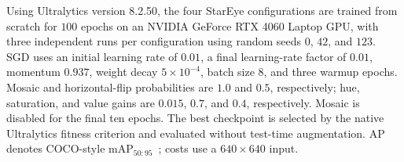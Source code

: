 \documentclass[letterpaper,10pt,conference]{ieeeconf}
\begin{document}
Using Ultralytics version 8.2.50, the four StarEye configurations are trained
from scratch for \(100\) epochs on an NVIDIA GeForce RTX 4060 Laptop GPU,
with three independent runs per configuration using random seeds \(0\),
\(42\), and \(123\). SGD uses an initial learning rate of \(0.01\),
a final learning-rate factor of \(0.01\), momentum \(0.937\), weight decay
\(5\times10^{-4}\), batch size \(8\), and three warmup epochs. Mosaic and
horizontal-flip probabilities are \(1.0\) and \(0.5\), respectively; hue,
saturation, and value gains are \(0.015\), \(0.7\), and \(0.4\), respectively.
Mosaic is disabled for the final ten epochs. The best checkpoint is selected by the native
Ultralytics fitness criterion and evaluated without test-time augmentation. AP
denotes COCO-style \(\mathrm{mAP}_{50:95}\)~\cite{ref_coco}; costs use a
\(640\times640\) input.
\end{document}
